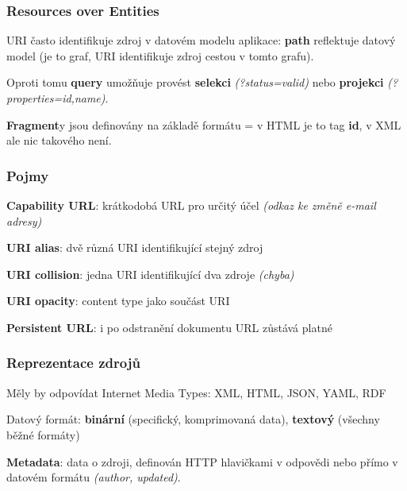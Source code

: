 \subsubsection*{Resources over Entities}

URI často identifikuje zdroj v datovém modelu aplikace: \textbf{path} reflektuje datový model (je to graf, URI identifikuje zdroj cestou v tomto grafu).

\vspace{4pt}
\noindent Oproti tomu \textbf{query} umožňuje provést \textbf{selekci} \textit{(?status=valid)} nebo \textbf{projekci} \textit{(?properties=id,name)}.

\vspace{4pt}
\noindent \textbf{Fragment}y jsou definovány na základě formátu = v HTML je to tag \textbf{id}, v XML ale nic takového není.

\subsubsection*{Pojmy}

\textbf{Capability URL}: krátkodobá URL pro určitý účel \textit{(odkaz ke změně e-mail adresy)}

\vspace{4pt}
\noindent \textbf{URI alias}: dvě různá URI identifikující stejný zdroj

\vspace{4pt}
\noindent \textbf{URI collision}: jedna URI identifikující dva zdroje \textit{(chyba)}

\vspace{4pt}
\noindent \textbf{URI opacity}: content type jako součást URI

\vspace{4pt}
\noindent \textbf{Persistent URL}: i po odstranění dokumentu URL zůstává platné

\subsubsection*{Reprezentace zdrojů}

Měly by odpovídat Internet Media Types: XML, HTML, JSON, YAML, RDF

\vspace{4pt}
\noindent Datový formát: \textbf{binární} (specifický, komprimovaná data), \textbf{textový} (všechny běžné formáty)

\vspace{4pt}
\noindent \textbf{Metadata}: data o zdroji, definován HTTP hlavičkami v odpovědi nebo přímo v datovém formátu \textit{(author, updated)}.

